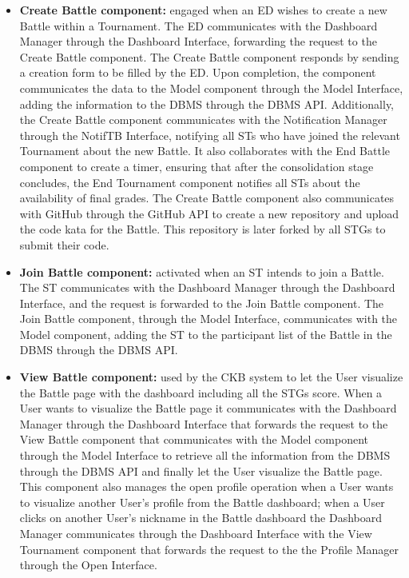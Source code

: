 \begin{itemize}
    \item \textbf{Create Battle component:} engaged when an ED wishes to create a new Battle within a Tournament. The ED communicates with the Dashboard Manager through the Dashboard Interface, forwarding the request to the Create Battle component. The Create Battle component responds by sending a creation form to be filled by the ED. Upon completion, the component communicates the data to the Model component through the Model Interface, adding the information to the DBMS through the DBMS API. Additionally, the Create Battle component communicates with the Notification Manager through the NotifTB Interface, notifying all STs who have joined the relevant Tournament about the new Battle. It also collaborates with the End Battle component to create a timer, ensuring that after the consolidation stage concludes, the End Tournament component notifies all STs about the availability of final grades. The Create Battle component also communicates with GitHub through the GitHub API to create a new repository and upload the code kata for the Battle. This repository is later forked by all STGs to submit their code.
    \item \textbf{Join Battle component:} activated when an ST intends to join a Battle. The ST communicates with the Dashboard Manager through the Dashboard Interface, and the request is forwarded to the Join Battle component. The Join Battle component, through the Model Interface, communicates with the Model component, adding the ST to the participant list of the Battle in the DBMS through the DBMS API.
    \item \textbf{View Battle component:} used by the CKB system to let the User visualize the Battle page with the dashboard including all the STGs score. When a User wants to visualize the Battle page it communicates with the Dashboard Manager through the Dashboard Interface that forwards the request to the View Battle component that communicates with the Model component through the Model Interface to retrieve all the information from the DBMS through the DBMS API and finally let the User visualize the Battle page. This component also manages the open profile operation when a User wants to visualize another User’s profile from the Battle dashboard; when a User clicks on another User’s nickname in the Battle dashboard the Dashboard Manager communicates through the Dashboard Interface with the View Tournament component that forwards the request to the the Profile Manager through the Open Interface.

\end{itemize}
